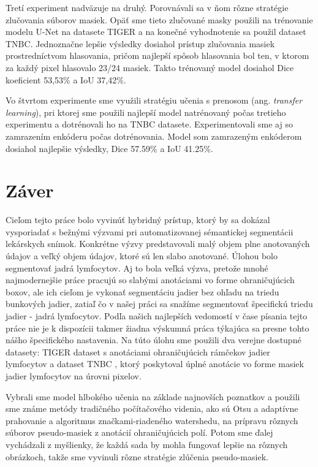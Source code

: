 Tretí experiment nadväzuje na druhý. Porovnávali sa v ňom rôzne stratégie zlučovania súborov masiek. Opäť sme tieto zlučované masky použili na trénovanie modelu U-Net na datasete TIGER a na konečné vyhodnotenie sa použil dataset TNBC. Jednoznačne lepšie výsledky dosiahol prístup zlučovania masiek prostredníctvom hlasovania, pričom najlepší spôsob hlasovania bol ten, v ktorom za každý pixel hlasovalo 23/24 masiek. Takto trénovaný model dosiahol Dice koeficient 53,53\% a IoU 37,42\%.

Vo štvrtom experimente sme využili stratégiu učenia s prenosom (ang. \textit{transfer learning}), pri ktorej sme použili najlepší model natrénovaný počas tretieho experimentu a dotrénovali ho na TNBC datasete. Experimentovali sme aj so zamrazením enkóderu počas dotrénovania. Model som zamrazeným enkóderom dosiahol najlepšie výsledky, Dice 57.59\% a IoU 41.25\%.

\section{Záver}
Cieľom tejto práce bolo vyvinúť hybridný prístup, ktorý by sa dokázal vysporiadať s bežnými výzvami pri automatizovanej sémantickej segmentácii lekárskych snímok. Konkrétne výzvy predstavovali malý objem plne anotovaných údajov a veľký objem údajov, ktoré sú len slabo anotované. Úlohou bolo segmentovať jadrá lymfocytov. Aj to bola veľká výzva, pretože mnohé najmodernejšie práce pracujú so slabými anotáciami vo forme ohraničujúcich boxov, ale ich cieľom je vykonať segmentáciu jadier bez ohľadu na triedu bunkových jadier, zatiaľ čo v našej práci sa snažíme segmentovať špecifickú triedu jadier - jadrá lymfocytov. Podľa našich najlepších vedomostí v čase písania tejto práce nie je k dispozícii takmer žiadna výskumná práca týkajúca sa presne tohto nášho špecifického nastavenia. Na túto úlohu sme použili dva verejne dostupné datasety: TIGER \cite{tiger_dataset} dataset s anotáciami ohraničujúcich rámčekov jadier lymfocytov a dataset TNBC \cite{TNBC-nuclei-seg-extended}, ktorý poskytoval úplné anotácie vo forme masiek jadier lymfocytov na úrovni pixelov. 

Vybrali sme model hlbokého učenia na základe najnovších poznatkov a použili sme známe metódy tradičného počítačového videnia, ako sú Otsu a adaptívne prahovanie a algoritmus značkami-riadeného watershedu, na prípravu rôznych súborov pseudo-masiek z anotácií ohraničujúcich polí. Potom sme ďalej vychádzali z myšlienky, že každá sada by mohla fungovať lepšie na rôznych obrázkoch, takže sme vyvinuli rôzne stratégie zlúčenia pseudo-masiek.

